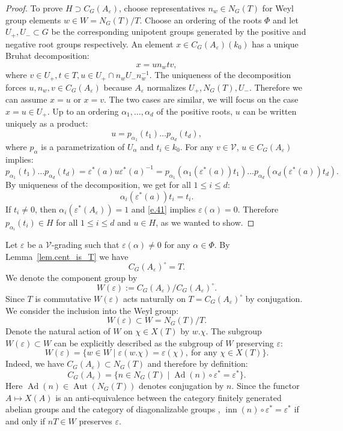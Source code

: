 \documentclass[12pt]{amsart}
\numberwithin{equation}{section}
\theoremstyle{definition}
\newcommand{\cV}{\mathcal{V}}
\newcommand{\Ad}{\operatorname{Ad}}
\newcommand{\Aut}{\operatorname{Aut}}
\newcommand{\eps}{\varepsilon}
\newcommand{\inn}{\operatorname{inn}}
\begin{document}
\begin{proof}
    \smallskip
    To prove $H\supset C_G(A_\eps)$, choose representatives $n_w\in N_{G}(T)$ for Weyl group elements $w\in W  = N_{G}(T)/T$. Choose an ordering of the roots $\Phi$ and let $U_+ ,U_-\subset G$ be the corresponding unipotent groups generated by the positive and negative root groups respectively. An element $x\in C_G(A_\eps)(k_0)$  has a unique Bruhat decomposition:
    $$x= un_w tv,$$
    where $v\in U_+,t\in T,u\in U_+ \cap n_w U_- n_w^{-1}$. The uniqueness of the decomposition forces $u,n_w,v\in C_G(A_\eps)$ because $A_\eps$ normalizes $U_+,N_{G}(T),U_-$. Therefore we can assume $x= u$ or $x=v$. The two cases are similar, we will focus on the case $x=u\in U_+$. Up to an ordering $\alpha_1,\dots,\alpha_d$ of the positive roots, $u$ can be written uniquely as a product:
    $$u = p_{\alpha_1}(t_1)\dots p_{\alpha_d}(t_d),$$
    where $p_\alpha$ is a parametrization of $U_\alpha$ and $t_i\in k_0$.  For any $v\in \cV$, $u\in C_G(A_\eps)$ implies:
    $$p_{\alpha_1}(t_1)\dots p_{\alpha_d}(t_d)= \eps^*(a) u \eps^*(a)^{-1} = p_{\alpha_1}(\alpha_1(\eps^*(a))t_1)\dots p_{\alpha_d}(\alpha_d(\eps^*(a))t_d).$$
    By uniqueness of the decomposition, we get for all $1\leq i\leq d$:
    $$\alpha_i(\eps^*(a))t_i = t_i.$$
    If $t_i\neq 0$, then $\alpha_i(\eps^*(A_\eps)) =1$ and \eqref{e.41} implies $\eps(\alpha) =0$. Therefore $p_{\alpha_i}(t_i)\in H$ for all $1\leq i\leq d$ and $u\in H$, as we wanted to show. 
\end{proof}

Let $\eps$ be a $\cV$-grading such that $\eps(\alpha)\neq 0$ for any $\alpha\in \Phi$.  By Lemma~\ref{lem.cent_is_T} we have $$C_G(A_\eps)^{\circ}=T.$$ We denote the component group by
$$W(\eps)  := C_G(A_\eps)/C_G(A_\eps)^\circ.$$
Since $T$ is commutative $W(\eps)$ acts naturally on $T= C_G(A_\eps)^{\circ}$ by conjugation. We consider the inclusion into the Weyl group:
\begin{equation}\label{e.emb_into_Weyl}
    W(\eps) \subset W = N_G(T)/T.
\end{equation}
Denote the natural action of $W$ on $\chi\in X(T)$ by $w.\chi$. The subgroup $W(\eps)\subset W$ can be explicitly described as the subgroup of $W$ preserving $\eps$: 
\begin{equation}\label{e.description_of_W(eps)}
    W(\eps) = \{ w\in W \mid  \eps(w.\chi) = \eps(\chi), \ \text{for any }\chi\in X(T)\}.
\end{equation}
Indeed, we have $C_G(A_\eps) \subset N_G(T)$ and therefore by definition:
$$C_G(A_\eps) = \{n\in N_G(T) \mid \Ad(n) \circ \eps^* = \eps^*\}.$$
Here $\Ad(n) \in \Aut(N_G(T))$ denotes conjugation by $n$. 
Since the functor $A \mapsto X(A)$ is an anti-equivalence between the category finitely generated abelian groups and the category of diagonalizable groups  \cite[Corollary 8.3]{borel1965groupes}, $\inn(n) \circ \eps^* = \eps^*$ if and only if $n T \in W$ preserves $\eps$.
\end{document}
